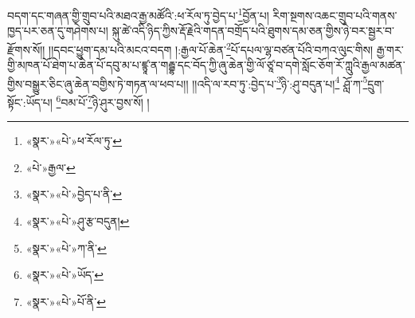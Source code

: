བདག་དང་གཞན་གྱི་གྲུབ་པའི་མཐའ་རྒྱ་མཚོའི་:ཕ་རོལ་ཏུ་བྱེད་པ་\footnote{«སྣར་»«པེ་»ཕ་རོལ་ཏུ་}བྱོན་པ། རིག་སྔགས་འཆང་གྲུབ་པའི་གནས་ཁྱད་པར་ཅན་དུ་གཤེགས་པ། སྐུ་ཚེ་འདི་ཉིད་ཀྱིས་རྡོ་རྗེའི་གདན་བགྲོད་པའི་ཐུགས་དམ་ཅན་གྱིས་ཉེ་བར་སྦྱར་བ་རྫོགས་སོ།། །།དབང་ཕྱུག་དམ་པའི་མངའ་བདག །:རྒྱལ་པོ་ཆེན་\footnote{«པེ་»རྒྱལ་}པོ་དཔལ་ལྷ་བཙན་པོའི་བཀའ་ལུང་གིས། རྒྱ་གར་གྱི་མཁན་པོ་ཐེག་པ་ཆེན་པོ་དབུ་མ་པ་ཛྙཱ་ན་གརྦྷ་དང་བོད་ཀྱི་ཞུ་ཆེན་གྱི་ལོ་ཙཱ་བ་དགེ་སློང་ཅོག་རོ་ཀླུའི་རྒྱལ་མཚན་གྱིས་བསྒྱུར་ཅིང་ཞུ་ཆེན་བགྱིས་ཏེ་གཏན་ལ་ཕབ་པ།། །།འདི་ལ་རབ་ཏུ་:བྱེད་པ་\footnote{«སྣར་»«པེ་»བྱེད་པ་ནི་}ཉི་:ཤུ་བདུན་པ།\footnote{«སྣར་»«པེ་»ཤུ་རྩ་བདུན།} ཤློ་ཀ་\footnote{«སྣར་»«པེ་»ཀ་ནི་}དྲུག་སྟོང་:ཡོད་པ། \footnote{«སྣར་»«པེ་»ཡོད་}བམ་པོ་\footnote{«སྣར་»«པེ་»པོ་ནི་}ཉི་ཤུར་བྱས་སོ། ། 